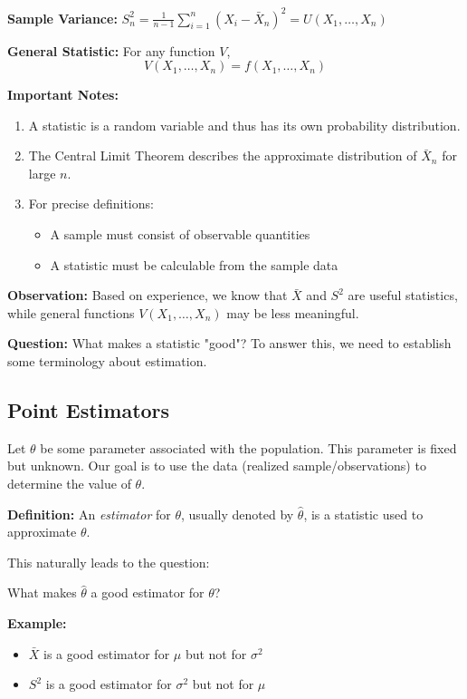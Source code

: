 \documentclass{article}
\begin{document}
    \textbf{Sample Variance:} $S^2_n = \frac{1}{n-1}\sum_{i=1}^n (X_i - \bar{X}_n)^2 = U(X_1, \ldots, X_n)$

    \textbf{General Statistic:} For any function $V$,
    \[V(X_1, \ldots, X_n) = f(X_1, \ldots, X_n)\]

    \textbf{Important Notes:}
    \begin{enumerate}
        \item A statistic is a random variable and thus has its own probability distribution.
        \item The Central Limit Theorem describes the approximate distribution of $\bar{X}_n$ for large $n$.
        \item For precise definitions:
        \begin{itemize}
            \item A sample must consist of observable quantities
            \item A statistic must be calculable from the sample data
        \end{itemize}
    \end{enumerate}

    \textbf{Observation:} Based on experience, we know that $\bar{X}$ and $S^2$ are useful statistics, while general functions $V(X_1,\ldots,X_n)$ may be less meaningful.

    \textbf{Question:} What makes a statistic "good"? To answer this, we need to establish some terminology about estimation.

    \subsection*{Point Estimators}
    Let $\theta$ be some parameter associated with the population. This parameter is fixed but unknown.
    Our goal is to use the data (realized sample/observations) to determine the value of $\theta$.

    \textbf{Definition:} An \emph{estimator} for $\theta$, usually denoted by $\hat{\theta}$, is a statistic used to approximate $\theta$.

    This naturally leads to the question:
    \begin{center}
        What makes $\hat{\theta}$ a good estimator for $\theta$?
    \end{center}

    \textbf{Example:} 
    \begin{itemize}
        \item $\bar{X}$ is a good estimator for $\mu$ but not for $\sigma^2$
        \item $S^2$ is a good estimator for $\sigma^2$ but not for $\mu$
    \end{itemize}
\end{document}
